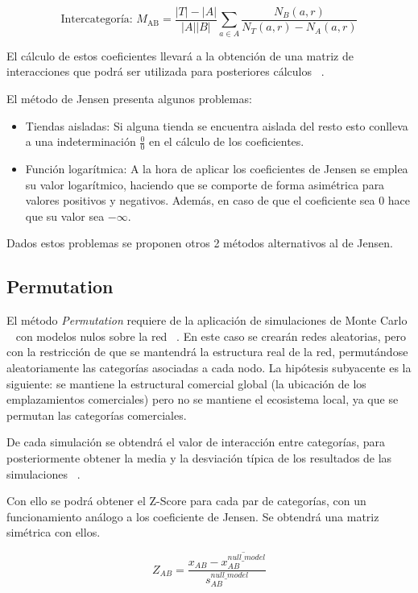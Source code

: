 \begin{equation*}
	\text{Intercategoría: }M_\text{AB} = \frac{|T| - |A|}{|A||B|} \sum_{a \in A}\frac{N_B(a,r)}{N_T(a,r) - N_A(a,r)}
\end{equation*}

El cálculo de estos coeficientes llevará a la obtención de una matriz de interacciones que podrá ser utilizada para posteriores cálculos ~\cite{Jensen2006}.

El método de Jensen presenta algunos problemas:

\begin{itemize}
	\item Tiendas aisladas: Si alguna tienda se encuentra aislada del resto esto conlleva a una indeterminación $\frac{0}{0}$ en el cálculo de los coeficientes.
	\item Función logarítmica: A la hora de aplicar los coeficientes de Jensen se emplea su valor logarítmico, haciendo que se comporte de forma asimétrica para valores positivos y negativos. Además, en caso de que el coeficiente sea 0 hace que su valor sea $-\infty$.
\end{itemize}

Dados estos problemas se proponen otros 2 métodos alternativos al de Jensen.
\subsection{Permutation}

El método \textit{Permutation} requiere de la aplicación de simulaciones de Monte Carlo ~\cite{Montecarlo} con modelos nulos sobre la red ~\cite{Ahedo2021,RSVAJSSHJG}. En este caso se crearán redes aleatorias, pero con la restricción de que se mantendrá la estructura real de la red, permutándose aleatoriamente las categorías asociadas a cada nodo. La hipótesis subyacente es la siguiente: se mantiene la estructural comercial global (la ubicación de los emplazamientos comerciales) pero no se mantiene el ecosistema local, ya que se permutan las categorías comerciales.

De cada simulación se obtendrá el valor de interacción entre categorías, para posteriormente obtener la media y la desviación típica de los resultados de las simulaciones ~\cite{Ahedo2021,RSVAJSSHJG}.

Con ello se podrá obtener el Z-Score para cada par de categorías, con un funcionamiento análogo a los coeficiente de Jensen. Se obtendrá una matriz simétrica con ellos.

\begin{equation*}
	Z_{AB} = \frac{x_{AB} - \overline{x_{AB}^{null\_model}}}{s_{AB}^{null\_model}}
\end{equation*}


